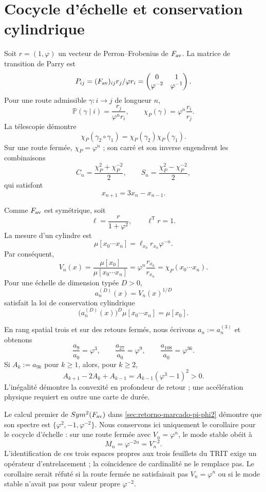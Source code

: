 \section{Cocycle d'échelle et conservation cylindrique}
\label{sec:cociclo-parry-escala}

Soit \(r=(1,\varphi)\) un vecteur de Perron--Frobenius de
\(F_{\rm av}\). La matrice de transition de Parry est
\[
P_{ij}=\frac{(F_{\rm av})_{ij}r_j}{\varphi r_i}
=
\begin{pmatrix}
0&1\\
\varphi^{-2}&\varphi^{-1}
\end{pmatrix}.
\]
Pour une route admissible \(\gamma:i\to j\) de longueur \(n\),
\[
\mathbb P(\gamma\mid i)=\frac{r_j}{\varphi^nr_i},
\qquad
\boxed{\chi_P(\gamma)=\varphi^n\frac{r_i}{r_j}.}
\]
La télescopie démontre
\[
\chi_P(\gamma_2\circ\gamma_1)
=\chi_P(\gamma_2)\chi_P(\gamma_1).
\]
Sur une route fermée, \(\chi_P=\varphi^n\) ; son carré et son inverse
engendrent les combinaisons
\[
C_n=\frac{\chi_P^2+\chi_P^{-2}}2,\qquad
S_n=\frac{\chi_P^2-\chi_P^{-2}}2,
\]
qui satisfont
\[
x_{n+1}=3x_n-x_{n-1}.
\]

Comme \(F_{\rm av}\) est symétrique, soit
\[
\ell=\frac{r}{1+\varphi^2},\qquad \ell^{\mathsf T}r=1.
\]
La mesure d’un cylindre est
\[
\mu[x_0\cdots x_n]=\ell_{x_0}r_{x_n}\varphi^{-n}.
\]
Par conséquent,
\[
\boxed{
V_n(x)
=\frac{\mu[x_0]}{\mu[x_0\cdots x_n]}
=\varphi^n\frac{r_{x_0}}{r_{x_n}}
=\chi_P(x_0\cdots x_n).}
\]
Pour une échelle de dimension typée \(D>0\),
\[
a_n^{(D)}(x)=V_n(x)^{1/D}
\]
satisfait la loi de conservation cylindrique
\[
\boxed{
\bigl(a_n^{(D)}(x)\bigr)^D
\mu[x_0\cdots x_n]=\mu[x_0].}
\]

En rang spatial trois et sur des retours fermés, nous écrivons
\(a_n:=a_n^{(3)}\) et obtenons
\[
\boxed{
\frac{a_9}{a_0}=\varphi^3,\qquad
\frac{a_{27}}{a_0}=\varphi^9,\qquad
\frac{a_{108}}{a_0}=\varphi^{36}.}
\]
Si \(A_k:=a_{9k}\) pour \(k\geq1\), alors, pour \(k\geq2\),
\[
A_{k+1}-2A_k+A_{k-1}
=A_{k-1}(\varphi^3-1)^2>0.
\]
L'inégalité démontre la convexité en profondeur de retour ; une accélération
physique requiert en outre une carte de durée.

Le calcul premier de
\(\operatorname{Sym}^2(F_{\rm av})\) dans
\cref{sec:retorno-marcado-pi-phi2} démontre que son spectre est
\(\{\varphi^2,-1,\varphi^{-2}\}\). Nous conservons ici uniquement le corollaire
pour le cocycle d'échelle : sur une route fermée avec \(V_n=\varphi^n\), le
mode stable obéit à
\[
\boxed{M_n=\varphi^{-2n}=V_n^{-2}.}
\]
L'identification de ces trois espaces propres aux trois feuillets du TRIT
exige un opérateur d'entrelacement ; la coïncidence de cardinalité ne le remplace pas. Le
corollaire serait réfuté si la route fermée ne satisfaisait pas
\(V_n=\varphi^n\) ou si le mode stable n'avait pas pour valeur propre
\(\varphi^{-2}\).

